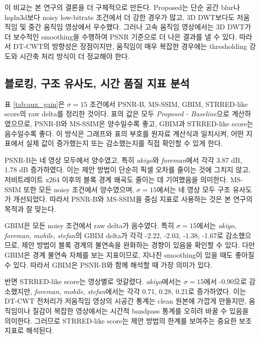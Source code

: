 \documentclass[10pt]{article}
\begin{document}
이 비교는 본 연구의 결론을 더 구체적으로 만든다. Proposed는 단순 공간 blur나 hqdn3d보다 noisy low-bitrate 조건에서 더 강한 경우가 많고, 3D DWT보다도 저움직임 및 중간 움직임 영상에서 우수했다. 그러나 고속 움직임 영상에서는 3D DWT가 더 보수적인 smoothing을 수행하여 PSNR 기준으로 더 나은 결과를 낼 수 있다. 따라서 DT-CWT의 방향성은 장점이지만, 움직임이 매우 복잡한 경우에는 thresholding 강도와 시간축 처리 방식이 더 정교해야 한다.

\subsection{블로킹, 구조 유사도, 시간 품질 지표 분석}
표 \ref{tab:aux_gain}은 $\sigma=15$ 조건에서 PSNR-B, MS-SSIM, GBIM, STRRED-like score의 raw delta를 정리한 것이다. 표의 값은 모두 \textit{Proposed - Baseline}으로 계산하였으므로, PSNR-B와 MS-SSIM은 양수일수록 좋고, GBIM과 STRRED-like score는 음수일수록 좋다. 이 방식은 그래프와 표의 부호를 원자료 계산식과 일치시켜, 어떤 지표에서 실제 값이 증가했는지 또는 감소했는지를 직접 확인할 수 있게 한다.

PSNR-B는 네 영상 모두에서 양수였고, 특히 \textit{akiyo}와 \textit{foreman}에서 각각 3.87 dB, 1.78 dB 증가하였다. 이는 제안 방법이 단순히 픽셀 오차를 줄이는 것에 그치지 않고, 저비트레이트 x264 이후의 블록 경계 왜곡도 줄이는 데 기여했음을 의미한다. MS-SSIM 또한 모든 noisy 조건에서 양수였으며, $\sigma=15$에서는 네 영상 모두 구조 유사도가 개선되었다. 따라서 PSNR-B와 MS-SSIM을 중심 지표로 사용하는 것은 본 연구의 목적과 잘 맞는다.

GBIM은 모든 noisy 조건에서 raw delta가 음수였다. 특히 $\sigma=15$에서는 \textit{akiyo}, \textit{foreman}, \textit{mobile}, \textit{stefan}의 GBIM delta가 각각 -2.22, -2.03, -1.38, -1.67로 감소했으므로, 제안 방법이 블록 경계의 불연속을 완화하는 경향이 있음을 확인할 수 있다. 다만 GBIM은 경계 불연속 자체를 보는 지표이므로, 지나친 smoothing이 있을 때도 좋아질 수 있다. 따라서 GBIM은 PSNR-B와 함께 해석할 때 가장 의미가 있다.

반면 STRRED-like score는 영상별로 엇갈렸다. \textit{akiyo}에서는 $\sigma=15$에서 -0.90으로 감소했지만, \textit{foreman}, \textit{mobile}, \textit{stefan}에서는 각각 0.71, 0.28, 0.21로 증가하였다. 이는 DT-CWT 전처리가 저움직임 영상의 시공간 통계는 clean 원본에 가깝게 만들지만, 움직임이나 질감이 복잡한 영상에서는 시간적 bandpass 통계를 오히려 바꿀 수 있음을 의미한다. 그러므로 STRRED-like score는 제안 방법의 한계를 보여주는 중요한 보조 지표로 해석된다.
\end{document}
